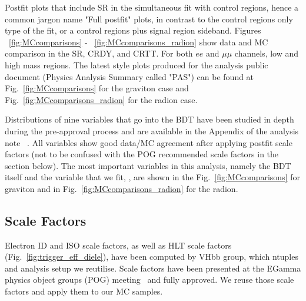 Postfit plots that include SR in the simultaneous fit with control regions, hence a common jargon name "Full postfit" plots, in contrast to the control regions only type of the fit, or a control regions plus signal region sideband. Figures ~\ref{fig:MCcomparisons} - ~\ref{fig:MCcomparisons_radion} show data and MC comparison in the SR, CRDY, and CRTT. For both $ee$ and $\mu\mu$ channels, low and high mass regions. The latest style plots produced for the analysis public document (Physics Analysis Summary called "PAS") can be found at Fig.~\ref{fig:MCcomparisons} for the graviton case and Fig.~\ref{fig:MCcomparisons_radion} for the radion case. 



Distributions of nine variables that go into the BDT have been studied in depth during the pre-approval process and are available in the Appendix of the analysis note ~\cite{bbZZAN}. All variables show good data/MC agreement after applying postfit scale factors (not to be confused with the POG recommended scale factors in the section below). %
The most important variables in this analysis, namely the BDT itself and the variable that we fit, \mTHH, are shown in the Fig.~\ref{fig:MCcomparisons} for graviton and in Fig.~\ref{fig:MCcomparisons_radion} for the radion. 

                                                                                                                                   








\subsection{Scale Factors}

Electron ID and ISO scale factors, as well as HLT scale factors (Fig.~\ref{fig:trigger_eff_diele}), have been computed by VHbb group, which ntuples and analysis setup we reutilise. Scale factors have been presented at the EGamma physics object groups (POG) meeting~\cite{egSF} and fully approved. We reuse those scale factors and apply them to our MC samples. 

